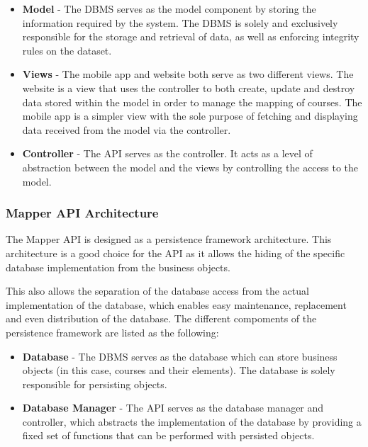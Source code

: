 \documentclass{article}
\begin{document}
    \begin{itemize}
        \item \textbf{Model} - The DBMS serves as the model component by
            storing the information required by the system. The DBMS is solely
            and exclusively responsible for the storage and retrieval of data,
            as well as enforcing integrity rules on the dataset.
        \item \textbf{Views} - The mobile app and website both serve as two
            different views. The website is a view that uses the controller to
            both create, update and destroy data stored within the model in
            order to manage the mapping of courses. The mobile app is a simpler
            view with the sole purpose of fetching and displaying data received
            from the model via the controller.
        \item \textbf{Controller} - The API serves as the controller. It acts
            as a level of abstraction between the model and the views by
            controlling the access to the model.
    \end{itemize}

    \subsubsection{Mapper API Architecture}

    The Mapper API is designed as a persistence framework architecture. This
    architecture is a good choice for the API as it allows the hiding of the
    specific database implementation from the business objects.

    This also allows the separation of the database access from the actual
    implementation of the database, which enables easy maintenance, replacement
    and even distribution of the database. The different compoments of the
    persistence framework are listed as the following:

    \begin{itemize}
        \item \textbf{Database} - The DBMS serves as the database which can
            store business objects (in this case, courses and their elements).
            The database is solely responsible for persisting objects.
        \item \textbf{Database Manager} - The API serves as the database
            manager and controller, which abstracts the implementation of the
            database by providing a fixed set of functions that can be
            performed with persisted objects.
    \end{itemize}
\end{document}
